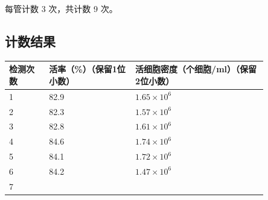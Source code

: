 \documentclass[UTF8,10pt,a4paper,fontset=fandol]{ctexart}
\newcommand{\fieldvalue}[1]{#1}
\newcommand{\handwritten}[1]{#1}
\begin{document}
每管计数
\fieldvalue{\handwritten{3}} 次，共计数
\fieldvalue{\handwritten{9}} 次。

\subsection*{计数结果}

\begin{center}
\small
\begin{tabular}{|p{0.13\linewidth}|p{0.29\linewidth}|p{0.43\linewidth}|}
\hline
检测次数 & 活率（\%）（保留1位小数） & 活细胞密度（个细胞/ml）（保留2位小数）\\
\hline
1 &
\fieldvalue{\handwritten{82.9}} &
\fieldvalue{\handwritten{$1.65\times10^6$}}\\
\hline
2 &
\fieldvalue{\handwritten{82.3}} &
\fieldvalue{\handwritten{$1.57\times10^6$}}\\
\hline
3 &
\fieldvalue{\handwritten{82.8}} &
\fieldvalue{\handwritten{$1.61\times10^6$}}\\
\hline
4 &
\fieldvalue{\handwritten{84.6}} &
\fieldvalue{\handwritten{$1.74\times10^6$}}\\
\hline
5 &
\fieldvalue{\handwritten{84.1}} &
\fieldvalue{\handwritten{$1.72\times10^6$}}\\
\hline
6 &
\fieldvalue{\handwritten{84.2}} &
\fieldvalue{\handwritten{$1.47\times10^6$}}\\
\hline
7 &

\end{tabular}
\end{center}
\end{document}
